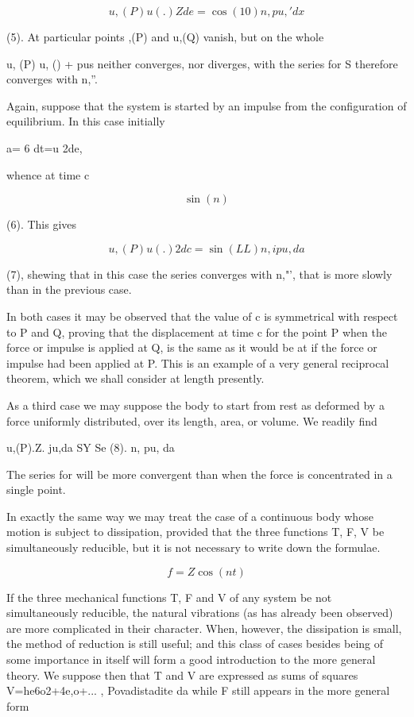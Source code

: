 \[u,(P) u(.)   Zde = \cos(10) n,    p u,'dx\]

(5). At particular points ,(P) and u,(Q) vanish, but on the whole

u, (P) u, () + pus neither converges, nor diverges, with the series for S
therefore converges with n,''.

Again, suppose that the system is started by an impulse from the configuration
of equilibrium. In this case initially

a= 6 dt=u 2de,

whence at time c

\[\sin(n)\]

(6). This gives

\[u, (P) u(.)  2d c=  \sin(LL) n, i pu, da\]

(7), shewing that in this case the series converges with n,"', that is more
slowly than in the previous case.

In both cases it may be observed that the value of c is symmetrical with
respect to P and Q, proving that the displacement at time c for the point P
when the force or impulse is applied at Q, is the same as it would be at if the
force or impulse had been applied at P. This is an example of a very general
reciprocal theorem, which we shall consider at length presently.

As a third case we may suppose the body to start from rest as deformed by a
force uniformly distributed, over its length, area, or volume. We readily find

u,(P).Z. ju,da SY Se (8). n, pu, da

The series for will be more convergent than when the force is concentrated in a
single point.

In exactly the same way we may treat the case of a continuous body whose motion
is subject to dissipation, provided that the three functions T, F, V be
simultaneously reducible, but it is not necessary to write down the formulae.

\[f= Z \cos(nt)\]

If the three mechanical functions T, F and V of any system be not
simultaneously reducible, the natural vibrations (as has already been observed)
are more complicated in their character. When, however, the dissipation is
small, the method of reduction is still useful; and this class of cases besides
being of some importance in itself will form a good introduction to the more
general theory. We suppose then that T and V are expressed as sums of squares
V=he6o2+4e,o+... , Povadistadite da while F still appears in the more general
form

